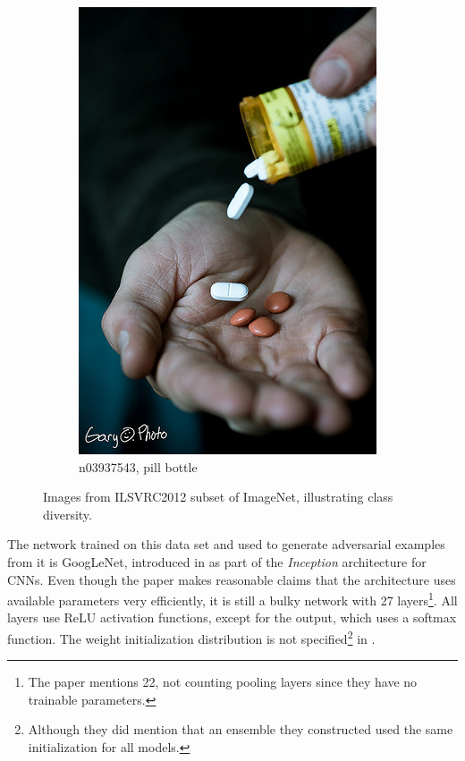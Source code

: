 \documentclass[11pt, a4paper]{article}
\begin{document}
\begin{figure}[h!tb]
\begin{subfigure}[t]{0.30\textwidth}
        \includegraphics[width=\textwidth]{imagenet/examples/n03937543_10012.JPEG}
        \caption{n03937543, pill bottle}
        \label{fig:imagenet-examples-6}
    \end{subfigure}
    \caption[ImageNet class diversity]{Images from ILSVRC2012 subset of ImageNet, illustrating class diversity.}
    \label{fig:imagenet-examples}
\end{figure}

The network trained on this data set and used to generate adversarial examples from it is GoogLeNet, introduced in \cite{going-deeper-with-convolutions} as part of the \emph{Inception} architecture for CNNs. Even though the paper makes reasonable claims that the architecture uses available parameters very efficiently, it is still a bulky network with 27 layers\footnote{The paper mentions 22, not counting pooling layers since they have no trainable parameters.}. All layers use ReLU activation functions, except for the output, which uses a softmax function. The weight initialization distribution is not specified\footnote{Although they did mention that an ensemble they constructed used the same initialization for all models.} in \cite{going-deeper-with-convolutions}.
\end{document}
